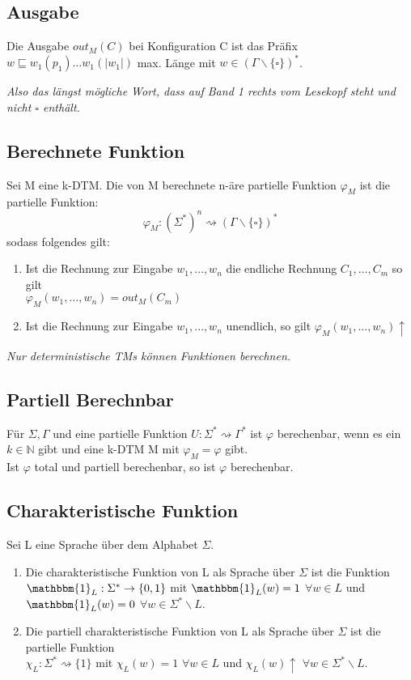 \subsection{Ausgabe} 
    Die Ausgabe \(out_M(C)\) bei Konfiguration C ist das Präfix \(w\sqsubseteq w_1(p_1)\dots w_1(|w_1|)\) max. Länge mit 
    \(w\in (\Gamma\backslash\{\square\})^*\).\par\bigskip
    \textit{Also das längst mögliche Wort, dass auf Band 1 rechts vom Lesekopf steht und nicht \(\square\) enthält.}
\subsection{Berechnete Funktion}
    Sei M eine k-DTM. Die von M berechnete n-äre partielle Funktion \(\varphi_M\) ist die partielle Funktion:
    \[\varphi_M:(\Sigma^*)^n\rightsquigarrow(\Gamma\backslash\{\square\})^*\]
    sodass folgendes gilt:
    \begin{enumerate}
        \item Ist die Rechnung zur Eingabe \(w_1,\dots,w_n\) die endliche Rechnung \(C_1,\dots,C_m\) so gilt\\ 
        \(\varphi_M(w_1,\dots,w_n)=out_M(C_m)\)
        \item Ist die Rechnung zur Eingabe \(w_1,\dots,w_n\) unendlich, so gilt \(\varphi_M(w_1,\dots,w_n)\uparrow\)
    \end{enumerate}\bigskip
    \textit{Nur deterministische TMs können Funktionen berechnen.}
\subsection{Partiell Berechnbar}
    Für \(\Sigma,\Gamma\) und eine partielle Funktion \(U:\Sigma^*\rightsquigarrow\Gamma^*\) ist \(\varphi\) berechenbar, 
    wenn es ein \(k\in\mathbb{N}\) gibt und eine k-DTM M mit \(\varphi_M=\varphi\) gibt.\\
    Ist \(\varphi\) total und partiell berechenbar, so ist \(\varphi\) berechenbar.
\subsection{Charakteristische Funktion}
    Sei L eine Sprache über dem Alphabet \(\Sigma\).
    \begin{enumerate}
        \item Die charakteristische Funktion von L als Sprache über \(\Sigma\) ist die Funktion\\
        \(\mathbbm{1}_L:\Sigma^*\to\{0,1\}\) mit \(\mathbbm{1}_L(w)=1\) \(\forall w\in L\) und \(\mathbbm{1}_L(w)=0\) \(\forall w\in\Sigma^*\backslash L\).
        \item Die partiell charakteristische Funktion von L als Sprache über \(\Sigma\) ist die partielle Funktion\\
        \(\chi_L:\Sigma^*\rightsquigarrow\{1\}\) mit \(\chi_L(w)=1\) \(\forall w\in L\) und \(\chi_L(w)\uparrow\) \(\forall w\in\Sigma^*\backslash L\).
    \end{enumerate}
